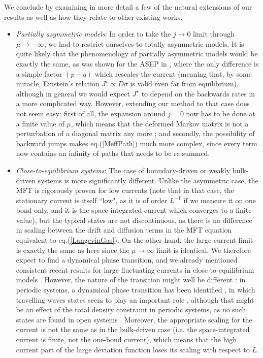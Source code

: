 \documentclass[aps,pre,onecolumn,showpacs,showkeys,a4paper]{revtex4-1}
\begin{document}
We conclude by examining in more detail a few of the natural extensions of our results as well as how they relate to other existing works.
\begin{itemize}
\item \textit{Partially asymmetric models}: In order to take the $j\rightarrow0$ limit through $\mu\rightarrow-\infty$, we had to restrict ourselves to totally asymmetric models. It is quite likely that the phenomenology of partially asymmetric models would be exactly the same, as was shown for the ASEP in \cite{Lazarescu2015}, where the only difference is a simple factor $(p-q)$ which rescales the current (meaning that, by some miracle, Einstein's relation $J^\star\propto D\sigma$ is valid even far from equilibrium), although in general we would expect $J^\star$ to depend on the backwards rates in a more complicated way. However, extending our method to that case does not seem easy: first of all, the expansion around $j=0$ now has to be done at a finite value of $\mu$, which means that the deformed Markov matrix is not a perturbation of a diagonal matrix any more ; and secondly, the possibility of backward jumps makes eq.(\ref{MeffPath}) much more complex, since every term now contains an infinity of paths that needs to be re-summed.
\item \textit{Close-to-equilibrium systems}: The case of boundary-driven or weakly bulk-driven systems is more significantly different. Unlike the asymmetric case, the MFT is rigorously proven for low currents (note that in that case, the stationary current is itself ``low", as it is of order $L^{-1}$ if we measure it on one bond only, and it is the space-integrated current which converges to a finite value), but the typical states are not discontinuous, as there is no difference in scaling between the drift and diffusion terms in the MFT equation equivalent to eq.(\ref{LangevinGas}). On the other hand, the large current limit is exactly the same as here since the $\mu\rightarrow\infty$ limit is identical. We therefore expect to find a dynamical phase transition, and we already mentioned consistent recent results for large fluctuating currents in close-to-equilibrium models \cite{Baek2016}. However, the nature of the transition might well be different : in periodic systems, a dynamical phase transition has been identified \cite{PhysRevE.72.066110,Bodineau2008,appert2008universal,Simon2011}, in which travelling waves states seem to play an important role \cite{PhysRevE.72.066110,Espigares2013}, although that might be an effect of the total density constraint in periodic systems, as no such states are found in open systems \cite{Lecomte2010,Baek2016a}. Moreover, the appropriate scaling for the current is not the same as in the bulk-driven case (i.e. the space-integrated current is finite, not the one-bond current), which means that the high current part of the large deviation function loses its scaling with respect to $L$.

\end{itemize}
\end{document}
